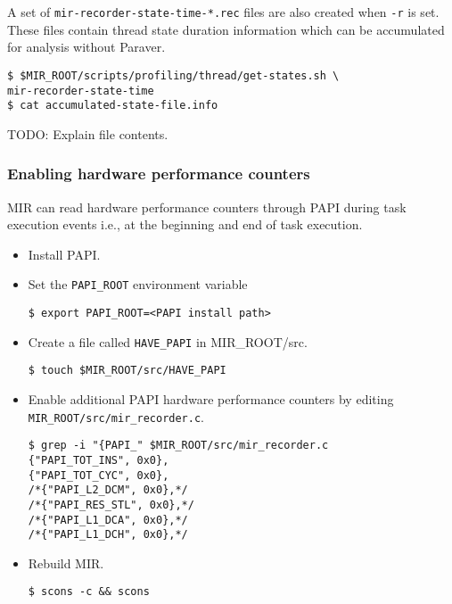 \documentclass[11pt,a4paper]{article}
\begin{document}
A set of \texttt{mir-recorder-state-time-*.rec} files are also created when \texttt{-r} is set. These files contain thread state duration information which can be accumulated for analysis without Paraver.

\begin{lstlisting}[style=MyInputStyle]
$ $MIR_ROOT/scripts/profiling/thread/get-states.sh \
mir-recorder-state-time
$ cat accumulated-state-file.info
\end{lstlisting}

TODO: Explain file contents.

\subsubsection{Enabling hardware performance counters}\label{enabling-hardware-performance-counters}

MIR can read hardware performance counters through PAPI during task execution events i.e., at the beginning and end of task execution.

\begin{itemize}
\item Install PAPI.
\item Set the \texttt{PAPI\_ROOT} environment variable

\begin{lstlisting}[style=MyInputStyle]
$ export PAPI_ROOT=<PAPI install path>
\end{lstlisting}

\item Create a file called \texttt{HAVE\_PAPI} in MIR\_ROOT/src.

\begin{lstlisting}[style=MyInputStyle]
$ touch $MIR_ROOT/src/HAVE_PAPI
\end{lstlisting}

\item Enable additional PAPI hardware performance counters by editing \texttt{MIR\_ROOT/src/mir\_recorder.c}.

\begin{lstlisting}[style=MyInputStyle]
$ grep -i "{PAPI_" $MIR_ROOT/src/mir_recorder.c
{"PAPI_TOT_INS", 0x0},
{"PAPI_TOT_CYC", 0x0},
/*{"PAPI_L2_DCM", 0x0},*/
/*{"PAPI_RES_STL", 0x0},*/
/*{"PAPI_L1_DCA", 0x0},*/
/*{"PAPI_L1_DCH", 0x0},*/
\end{lstlisting}

\item Rebuild MIR.

\begin{lstlisting}[style=MyInputStyle]
$ scons -c && scons
\end{lstlisting}
\end{itemize}
\end{document}

